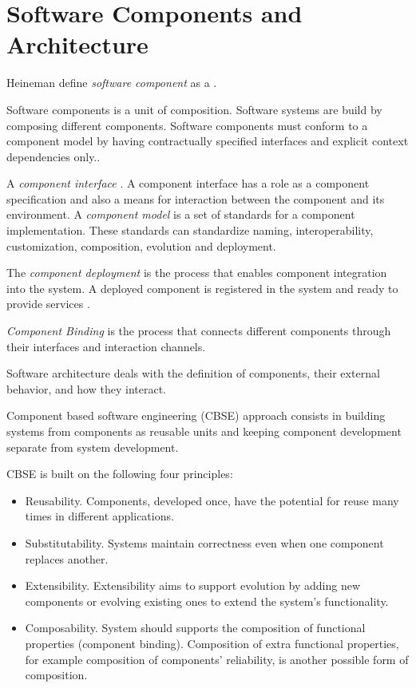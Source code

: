 \section{Software Components and Architecture}

Heineman define \textit{software component} as a
\cite{heineman_component-based_2001}.

Software components is a unit of composition. Software systems are build by composing different components.  Software components must conform to a component model by having contractually specified interfaces and explicit context dependencies only.\cite{szyperski_component_2002}.

A \textit{component	interface} \cite{crnkovic_software_2011}.
A component interface has a role as a component specification and also a means for interaction between the component and its environment.
A \textit{component model} is a set of standards for a component implementation. These standards can standardize naming, interoperability, customization, composition, evolution and deployment.\cite{heineman_component-based_2001}

The \textit{component deployment} is the process that enables component integration into the system. A deployed component is registered in the system and ready to provide services \cite{crnkovic_software_2011}.

\textit{Component Binding} is the process that connects different components through their interfaces and interaction channels.

Software architecture deals with the definition of components, their external behavior, and how they interact.\cite{kaur_component_2010}

Component based software engineering (CBSE) approach consists in building systems from components as reusable units and keeping component development separate from system development\cite{crnkovic_software_2011}.

CBSE is built on the following four principles\cite{crnkovic_software_2011}:
\begin{itemize}
  \item Reusability. Components, developed once, have the potential for reuse many times in different applications.
  \item Substitutability. Systems maintain correctness even when one component replaces another.
  \item Extensibility. Extensibility aims to support evolution by adding new components or evolving existing ones to extend the system’s functionality.
  \item Composability. System should supports the composition of functional properties (component binding). Composition of extra functional properties, for example composition of components’ reliability, is another possible form of composition.
\end{itemize}

